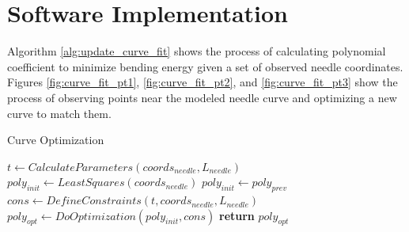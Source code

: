 

\section{Software Implementation}
Algorithm \ref{alg:update_curve_fit} shows the process of calculating polynomial coefficient to minimize bending energy given a set of observed needle coordinates. Figures \ref{fig:curve_fit_pt1}, \ref{fig:curve_fit_pt2}, and \ref{fig:curve_fit_pt3} show the process of observing points near the modeled needle curve and optimizing a new curve to match them.


\begin{algorithm}
\caption{Curve Optimization}
\label{alg:update_curve_fit}
\begin{algorithmic}[1]
\State $t \gets CalculateParameters(coords_{needle}, L_{needle})$
	\State $poly_{init} \gets LeastSquares(coords_{needle})$
\Else
	\State $poly_{init} \gets poly_{prev}$
\EndIf
\State $cons \leftarrow DefineConstraints(t, coords_{needle}, L_{needle})$
\State $poly_{opt} \gets DoOptimization(poly_{init}, cons)$
\State \textbf{return} $poly_{opt}$
\EndProcedure
\end{algorithmic}
\end{algorithm}

